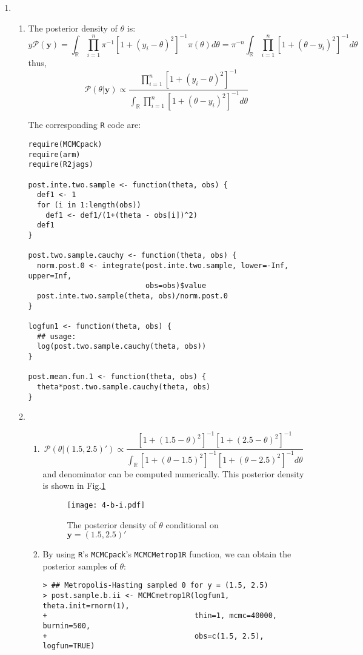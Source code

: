\documentclass[twoside,11pt]{amsart}
\begin{document}
\begin{enumerate}
\item
  \begin{enumerate}
  \item The posterior density of $\theta$ is:
    \[ 
y    \mathscr P(\bm y) = 
    \int_{\mathbb R}\prod_{i=1}^n\pi^{-1}[1 +
    (y_i-\theta)^2]^{-1}\pi(\theta)d\theta = \pi^{-n}\int_{\mathbb R}\prod_{i=1}^n[1 +
    (\theta-y_i)^2]^{-1}d\theta 
    \]
    thus,
    \[ 
    \mathscr P(\theta|\bm y) \propto \frac{\prod_{i=1}^n[1 +
    (y_i-\theta)^2]^{-1}}{\int_{\mathbb R}\prod_{i=1}^n[1 +
    (\theta-y_i)^2]^{-1}d\theta}
    \]

    The corresponding {\tt R} code are:    
    \begin{small}
    \begin{verbatim}
require(MCMCpack)
require(arm)
require(R2jags)

post.inte.two.sample <- function(theta, obs) {
  def1 <- 1
  for (i in 1:length(obs))
    def1 <- def1/(1+(theta - obs[i])^2)
  def1
}

post.two.sample.cauchy <- function(theta, obs) {
  norm.post.0 <- integrate(post.inte.two.sample, lower=-Inf, upper=Inf, 
                           obs=obs)$value
  post.inte.two.sample(theta, obs)/norm.post.0
}

logfun1 <- function(theta, obs) {
  ## usage:
  log(post.two.sample.cauchy(theta, obs))
}

post.mean.fun.1 <- function(theta, obs) {
  theta*post.two.sample.cauchy(theta, obs)
}      
    \end{verbatim}
    \end{small}
  \item
    \begin{enumerate}
    \item
      \[ 
      \mathscr P\left(\theta|(1.5, 2.5)'\right) \propto \frac{[1 +
        (1.5 - \theta)^2]^{-1}[1 +
        (2.5 - \theta)^2]^{-1}}{\int_{\mathbb R}[1 +
        (\theta - 1.5)^2]^{-1}[1 +
        (\theta - 2.5)^2]^{-1}d\theta}
      \]
      and denominator can be computed numerically. This posterior
      density is shown in Fig.\ref{fig:4-b-i}

      \begin{figure}[h]
        \texttt{[image: 4-b-i.pdf]}
        \caption{The posterior density of $\theta$ conditional on $\bm
          y = (1.5, 2.5)'$}\label{fig:4-b-i}
      \end{figure}

    \item
      By using {\tt R}'s {\tt MCMCpack}'s {\tt MCMCMetrop1R} function,
      we can obtain the posterior samples of $\theta$:      
      \begin{small}
      \begin{verbatim}
> ## Metropolis-Hasting sampled θ for y = (1.5, 2.5)
> post.sample.b.ii <- MCMCmetrop1R(logfun1, theta.init=rnorm(1), 
+                                  thin=1, mcmc=40000, burnin=500, 
+                                  obs=c(1.5, 2.5), logfun=TRUE) 


\end{verbatim}
\end{small}
\end{enumerate}
\end{enumerate}
\end{enumerate}
\end{document}
